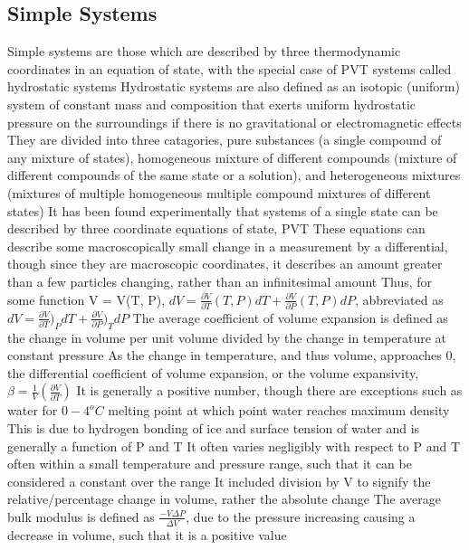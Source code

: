 \documentclass[11 pt, twoside]{article}
\newenvironment{outline*}
{
	\begin{outline}[enumerate]
	}
	{\end{outline}
}
\begin{document}
\subsection{Simple Systems}
\begin{outline*}
\1 Simple systems are those which are described by three thermodynamic coordinates in an equation of state, with the special case of PVT systems called hydrostatic systems
\1 Hydrostatic systems are also defined as an isotopic (uniform) system of constant mass and composition that exerts uniform hydrostatic pressure on the surroundings if there is no gravitational or electromagnetic effects
\2 They are divided into three catagories, pure substances (a single compound of any mixture of states), homogeneous mixture of different compounds (mixture of different compounds of the same state or a solution), and heterogeneous mixtures (mixtures of multiple homogeneous multiple compound mixtures of different states)
\3 It has been found experimentally that systems of a single state can be described by three coordinate equations of state, PVT
\2 These equations can describe some macroscopically small change in a measurement by a differential, though since they are macroscopic coordinates, it describes an amount greater than a few particles changing, rather than an infinitesimal amount
\2 Thus, for some function V = V(T, P), $dV = \frac{\partial V}{\partial T}(T, P)dT + \frac{\partial V}{\partial P}(T, P)dP$, abbreviated as $dV = \frac{\partial V}{\partial T})_PdT + \frac{\partial V}{\partial P})_TdP$
\3 The average coefficient of volume expansion is defined as the change in volume per unit volume divided by the change in temperature at constant pressure
\4 As the change in temperature, and thus volume, approaches 0, the differential coefficient of volume expansion, or the volume expansivity, $\beta = \frac{1}{V}(\frac{\partial V}{\partial T})$
\4 It is generally a positive number, though there are exceptions such as water for $0-4^o C$ melting point at which point water reaches maximum density
\4 This is due to hydrogen bonding of ice and surface tension of water and is generally a function of P and T
\4 It often varies negligibly with respect to P and T often within a small temperature and pressure range, such that it can be considered a constant over the range
\4 It included division by V to signify the relative/percentage change in volume, rather the absolute change
\3 The average bulk modulus is defined as $\frac{-V\Delta P}{\Delta V}$, due to the pressure increasing causing a decrease in volume, such that it is a positive value

\end{outline*}
\end{document}
